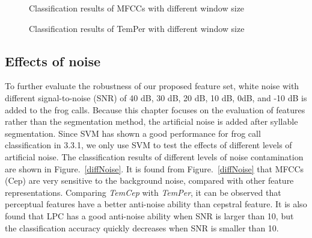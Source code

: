 \begin{figure}[htb!] %
\caption{Classification results of MFCCs with different window size}
\label{diffWinSize1} 
\end{figure}

\begin{figure}[htb!] %
\caption{Classification results of TemPer with different window size}
\label{diffWinSize2} 
\end{figure}

\subsection{Effects of noise}
To further evaluate the robustness of our proposed feature set, white noise with different signal-to-noise (SNR) of 40 dB, 30 dB, 20 dB, 10 dB, 0dB, and -10 dB is added to the frog calls. Because this chapter focuses on the evaluation of features rather than the segmentation method, the artificial noise is added after syllable segmentation. Since SVM has shown a good performance for frog call classification in 3.3.1, we only use SVM to test the effects of different levels of artificial noise. The classification results of different levels of noise contamination are shown in Figure.~\ref{diffNoise}. It is found from Figure.~\ref{diffNoise} that MFCCs (Cep) are very sensitive to the background noise, compared with other feature representations. Comparing \textit{TemCep} with \textit{TemPer}, it can be observed that perceptual features have a better anti-noise ability than cepstral feature. It is also found that LPC has a good anti-noise ability when SNR is larger than 10, but the classification accuracy quickly decreases when SNR is smaller than 10. 


